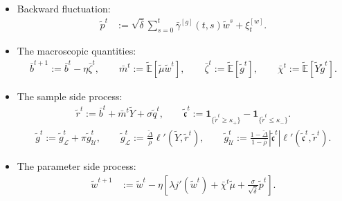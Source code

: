 \begin{definition}
\begin{itemize}[wide]
\item Backward fluctuation:
\vspace{-21pt}
\begin{align}
    \tilde p^t
    &:=
    \sqrt{\bar\delta}
    \sum_{s=0}^{t}
        \bar\gamma^{[g]}(t,s)\tilde w^s
    +
    \xi_t^{[w]}.
    \label{eq:p-memory-definition}
\end{align}

\item The macroscopic quantities:
\begin{align}
    \bar b^{t+1}
    :=
    \bar b^t
    -
    \eta\bar\zeta^t,
    \qquad
    \bar m^t
    :=
    \tilde{\mathbb E}
    [
        \tilde\mu\tilde w^t
    ],
    \qquad
    \bar\zeta^t
    :=
    \tilde{\mathbb E}
    [
        \tilde g^t
    ],
    \qquad
    \bar\chi^t
    :=
    \tilde{\mathbb E}
    [
        \tilde Y\tilde g^t
    ].
\end{align}

\item The sample side process:
\begin{align}
    \tilde r^t
    :=
    \bar b^t
    +
    \bar m^t\tilde Y
    +
    \sigma\tilde q^t,
    \qquad
    \tilde{\mathfrak c}^t
    :=
    \mathbf 1_{\{\tilde r^t\ge\kappa_+\}}
    -
    \mathbf 1_{\{\tilde r^t\le\kappa_-\}}.
    \label{eq:mean-field-score}
\end{align}
\vspace{-21pt}
\begin{align}
    \tilde g^t
    :=
    \tilde g_{\mathcal L}^t
    +
    \pi\tilde g_{\mathcal U}^t,
    \qquad
    \tilde g_{\mathcal L}^t
    :=
    \frac{\tilde\Delta}{\bar\rho}
    \ell'
    \left(
        \tilde Y,\tilde r^t
    \right),
    \qquad
    \tilde g_{\mathcal U}^t
    :=
    \frac{1-\tilde\Delta}{1-\bar\rho}
    \left| \tilde{\mathfrak c}^t \right|
    \ell'
    \left(
        \tilde{\mathfrak c}^t,\tilde r^t
    \right).
    \label{eq:g-U-definition}
\end{align}

\item The parameter side process:
\begin{align}
    \tilde w^{t+1}
    &:=
    \tilde w^t
    -
    \eta
    \left[
        \lambda j'(\tilde w^t)
        +
        \bar\chi^t\tilde\mu
        +
        \frac{\sigma}{\sqrt{\bar\delta}}
        \tilde p^t
    \right].
    \label{eq:w-update-definition}
\end{align}
\end{itemize}
\end{definition}

